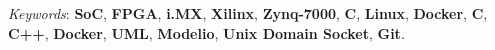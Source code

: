 \documentclass[letterpaper]{twentysecondcv} %
\begin{document}
\begin{twenty}
{            \vspace{1 mm}
            \textit{Keywords}: \textbf{SoC}, \textbf{FPGA}, \textbf{i.MX}, \textbf{Xilinx}, \textbf{Zynq-7000}, \textbf{C}, \textbf{Linux}, \textbf{Docker}, \textbf{C}, \textbf{C++}, \textbf{Docker}, \textbf{UML}, \textbf{Modelio}, \textbf{Unix Domain Socket}, \textbf{Git}.
        }\\


\end{twenty}
\end{document}
